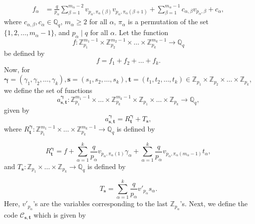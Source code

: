 \documentclass[pdflatex,sn-mathphys-num]{sn-jnl}%
\theoremstyle{thmstyleone}
\begin{document}
	\begin{equation}
		\begin{split}
			f_\alpha
			&= \frac{q}{p_\alpha}  \sum_{\beta=1}^{m_\alpha-2}  v_{p_\alpha, \pi_\alpha(\beta)} v_{p_\alpha, \pi_\alpha(\beta+1)} +  \sum_{\beta=1}^{m_\alpha-1}  c_{\alpha, \beta} v_{p_\alpha, \beta} + c_\alpha,
		\end{split}
	\end{equation}
	where $c_{\alpha, \beta}, c_\alpha \in \mathbb{Q}_q$, $m_\alpha \geq 2$ for all $\alpha$, $\pi_\alpha$ is a permutation of the set $\{1,2, \dots, m_\alpha-1\}$, and $p_\alpha \mid q$ for all $\alpha$.
	Let the function
	\begin{equation}
		f: \mathbb{Z}_{p_1}^{m_1-1} \times \mathbb{Z}_{p_2}^{m_2-1} \times \dots \times \mathbb{Z}_{p_k}^{m_k-1} \rightarrow \mathbb{Q}_q
	\end{equation} 
	be defined by
	\begin{equation}
		f= f_1 + f_2+ \dots + f_k.
	\end{equation}
	Now, for $\bm{\gamma}= (\gamma_1, \gamma_2, \dots, \gamma_k),\mathbf{s}= (s_1, s_2, \dots, s_k), \mathbf{t}=(t_1, t_2, \dots, t_k) \in \mathbb{Z}_{p_1} \times \mathbb{Z}_{p_2} \times \dots \times \mathbb{Z}_{p_k}$, we define the set of functions
	\begin{equation}
		a_{\mathbf{s},\mathbf{t}}^{\bm{\gamma}}: \mathbb{Z}_{p_1}^{m_1-1} \times \dots \times \mathbb{Z}_{p_k}^{m_k-1} \times \mathbb{Z}_{p_1} \times \dots \times \mathbb{Z}_{p_k} \rightarrow \mathbb{Q}_q,
	\end{equation} 
	given by 
	\begin{equation}
		a_{\mathbf{s},\mathbf{t}}^{\bm{\gamma}}=  R_{\mathbf{t}}^{\bm{\gamma}} + T_{\mathbf{s}},
	\end{equation}
	where $ R_{\mathbf{t}}^{\bm{\gamma}} :  \mathbb{Z}_{p_1}^{m_1-1} \times \dots \times \mathbb{Z}_{p_k}^{m_k-1} \rightarrow \mathbb{Q}_q$ is defined by
	
	\begin{equation}
		R_{\mathbf{t}}^{\bm{\gamma}} = f+ \sum_{\alpha=1}^{k} \frac{q}{p_\alpha} v_{p_\alpha, \pi_\alpha(1)} \gamma_\alpha + \sum_{\alpha=1}^{k} \frac{q}{p_\alpha} v_{p_\alpha, \pi_\alpha(m_\alpha-1)} t_\alpha,
	\end{equation}
	and 
	$ T_{\mathbf{s}} :  \mathbb{Z}_{p_1} \times \dots \times \mathbb{Z}_{p_k} \rightarrow \mathbb{Q}_q$ is defined by
	
	\begin{equation}
		T_{\mathbf{s}} = \sum_{\alpha=1}^{k} \frac{q}{p_\alpha} v'_{p_\alpha} s_\alpha.
	\end{equation}
	Here, $v'_{p_\alpha}$'s are the variables corresponding to the last $\mathbb{Z}_{p_\alpha}$'s.
	Next, we define the code $\mathcal{C}_{\mathbf{s}, \mathbf{t}}$ which is given by
	
\end{document}
